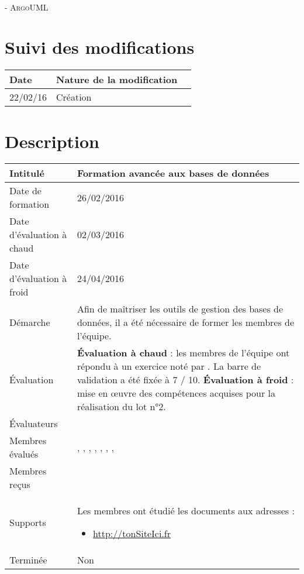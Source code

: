 \documentclass[asi, sansVersion]{picInsa}
\begin{document}
	\begin{center}
		\LARGE
		\textsc{
			\FF{}\\
			 - ArgoUML
		}
	\end{center}
	\vspace{0.5cm}

	\section*{Suivi des modifications}
		\begin{table}[H]
			\centering
			\begin{tabularx}{18cm}{|p{1.7cm}|X|p{4cm}|}
				\hline
				\rowcolor[gray]{0.90} Date & Nature de la modification \\
				\hline
				
				22/02/16 & Création \\
				\hline
			\end{tabularx}
		\end{table}

	\section*{Description}
		\begin{longtable}{|p{}|p{}|}
			\hline
			\cellcolor{gris2} Intitulé & Formation avancée aux bases de données\\\hline
			\cellcolor{gris2} Date de formation & 26/02/2016\\\hline
			\cellcolor{gris2} Date d'évaluation à chaud & 02/03/2016 \\\hline
			\cellcolor{gris2} Date d'évaluation à froid & 24/04/2016\\\hline
			\cellcolor{gris2} Démarche & Afin de maîtriser les outils de gestion des bases de données, il a été nécessaire de former les membres de l'équipe.\\\hline
			\cellcolor{gris2} Évaluation &
				\textbf{Évaluation à chaud} : les membres de l'équipe ont répondu à un exercice noté par \Julie. La barre de validation a été fixée à 7 / 10.\newline
				\textbf{Évaluation à froid} : mise en œuvre des compétences acquises pour la réalisation du lot n°2.\\\hline
			\cellcolor{gris2} Évaluateurs & \Sergi{}\\\hline
			\cellcolor{gris2} Membres évalués & \Pierre{}, \Melissa{}, \Julie{}, \Michel{}, \Matthieu{}, \Mathieu{}, \Florian{}, \Kafui{}\\\hline
			\cellcolor{gris2} Membres reçus &  \\\hline
			\cellcolor{gris2} Supports & Les membres ont étudié les documents aux adresses : \begin{itemize}
			\item \url{http://tonSiteIci.fr}
		\end{itemize}
			 \\\hline
			\cellcolor{gris2} Terminée & Non \\\hline
		\end{longtable}
\end{document}
